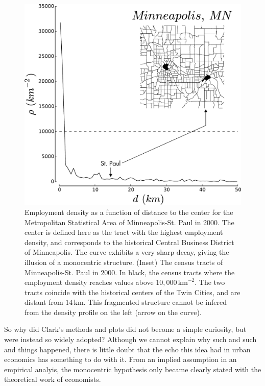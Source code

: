 \begin{figure}
    \centering
    \includegraphics[width=\textwidth]{./gfx/chapter-monocentric/distance_center_minneapolis.pdf}
    \caption{Employment density as a function of distance to the center for the
    Metropolitan Statistical Area of Minneapolis-St. Paul in 2000. The center is defined here as the
    tract with the highest employment density, and corresponds to the historical
    Central Business District of Minneapolis. The curve exhibits a very sharp
    decay, giving the illusion of a monocentric structure. (Inset) The census tracts
    of Minneapolis-St. Paul in 2000. In black, the census tracts where the
    employment density reaches values above $10,000\,\text{km}^{-2}$. The two tracts
    coincide with the historical centers of the Twin Cities, and are distant from
    $14\,\text{km}$. This fragmented structure cannot be infered from the density
    profile on the left (arrow on the curve).
    \label{fig:distance_center_Minneapolis}}
\end{figure}


So why did Clark's methods and plots did not become a simple curiosity, but were
instead so widely adopted? Although we cannot explain why such and such and
things happened, there is little doubt that the echo this idea had in urban
economics has something to do with it. From an implied assumption in an
empirical analyis, the monocentric hypothesis only became clearly stated with
the theoretical work of economists.


